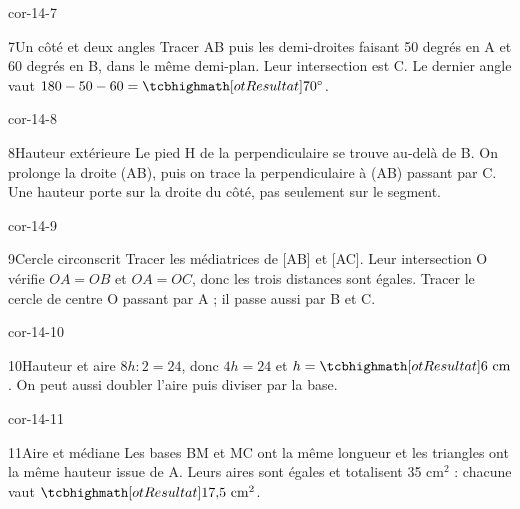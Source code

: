 \begin{blocLivre}{cor-14-7}\begin{corrige}{7}{Un côté et deux angles}
Tracer AB puis les demi-droites faisant 50 degrés en A et 60 degrés en B, dans le même demi-plan. Leur intersection est C. Le dernier angle vaut $180-50-60=\res{70^\circ}$.
\label{fig-cor-14-7}
\end{corrige}\end{blocLivre}
\begin{blocLivre}{cor-14-8}\begin{corrige}{8}{Hauteur extérieure}
Le pied H de la perpendiculaire se trouve au-delà de B. On prolonge la droite (AB), puis on trace la perpendiculaire à (AB) passant par C. Une hauteur porte sur la droite du côté, pas seulement sur le segment.
\label{fig-cor-14-8}
\end{corrige}\end{blocLivre}
\begin{blocLivre}{cor-14-9}\begin{corrige}{9}{Cercle circonscrit}
Tracer les médiatrices de [AB] et [AC]. Leur intersection O vérifie $OA=OB$ et $OA=OC$, donc les trois distances sont égales. Tracer le cercle de centre O passant par A ; il passe aussi par B et C.
\label{fig-cor-14-9}
\end{corrige}\end{blocLivre}
\begin{blocLivre}{cor-14-10}\begin{corrige}{10}{Hauteur et aire}
$8h:2=24$, donc $4h=24$ et $h=\res{6\ \mathrm{cm}}$. On peut aussi doubler l’aire puis diviser par la base.
\label{fig-cor-14-10}
\end{corrige}\end{blocLivre}
\begin{blocLivre}{cor-14-11}\begin{corrige}{11}{Aire et médiane}
Les bases BM et MC ont la même longueur et les triangles ont la même hauteur issue de A. Leurs aires sont égales et totalisent 35 cm$^2$ : chacune vaut $\res{17{,}5\ \mathrm{cm}^2}$.
\label{fig-cor-14-11}
\end{corrige}\end{blocLivre}
